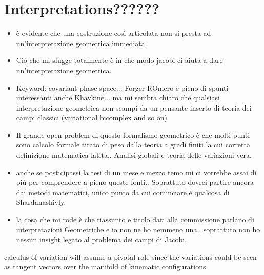 \documentclass[Main]{subfiles}
\begin{document}
\section{Interpretations??????}
\ifToninus
	\begin{Warning}
		\begin{itemize}
			\item 		è evidente che una costruzione così articolata non si presta ad un'interpretazione geometrica immediata.
			\item 		Ciò che mi sfugge totalmente è in che modo jacobi ci aiuta a dare  un'interpretazione geometrica.
			\item		Keyword: covariant phase space...  Forger ROmero è pieno di spunti interessanti anche Khavkine... ma mi sembra chiaro che qualsiasi interpretazione geometrica non scampi da un pensante inserto di teoria dei campi classici (variational bicomplex and so on)
			\item		Il grande open problem di questo formalismo geometrico è che molti punti sono calcolo formale tirato di peso dalla teoria a gradi finiti la cui corretta definizione matematica latita.. Analisi globali e teoria delle variazioni vera.
			\item anche se posticipassi la tesi di un mese  e mezzo temo mi ci vorrebbe assai di più per comprendere a pieno queste fonti.. Soprattuto dovrei partire ancora dai metodi matematici, unico punto da cui cominciare è qualcosa di Shardanashivly.
			\item la cosa che mi rode è che riassunto e titolo dati alla commissione parlano di interpretazioni Geometriche e io non ne ho nemmeno una., soprattuto non ho nessun insight legato al problema dei campi di Jacobi.
			
		\end{itemize}
		
				calculus of variation will assume a pivotal role since the variations could be seen as tangent vectors over the manifold of  kinematic configurations.


	\end{Warning}
\fi
\end{document}
